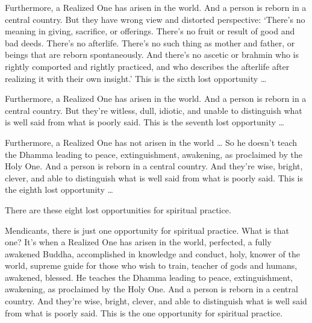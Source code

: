 \documentclass[12pt,openany]{book}%
\begin{document}
Furthermore, a Realized One has arisen in the world. And a person is reborn in a central country. But they have wrong view and distorted perspective: ‘There’s no meaning in giving, sacrifice, or offerings. There’s no fruit or result of good and bad deeds. There’s no afterlife. There’s no such thing as mother and father, or beings that are reborn spontaneously. And there’s no ascetic or brahmin who is rightly comported and rightly practiced, and who describes the afterlife after realizing it with their own insight.’ This is the sixth lost opportunity … 

Furthermore, a Realized One has arisen in the world. And a person is reborn in a central country. But they’re witless, dull, idiotic, and unable to distinguish what is well said from what is poorly said. This is the seventh lost opportunity … 

Furthermore, a Realized One has not arisen in the world … So he doesn’t teach the Dhamma leading to peace, extinguishment, awakening, as proclaimed by the Holy One. And a person is reborn in a central country. And they’re wise, bright, clever, and able to distinguish what is well said from what is poorly said. This is the eighth lost opportunity … 

There are these eight lost opportunities for spiritual practice. 

Mendicants, there is just one opportunity for spiritual practice. What is that one? It’s when a Realized One has arisen in the world, perfected, a fully awakened Buddha, accomplished in knowledge and conduct, holy, knower of the world, supreme guide for those who wish to train, teacher of gods and humans, awakened, blessed. He teaches the Dhamma leading to peace, extinguishment, awakening, as proclaimed by the Holy One. And a person is reborn in a central country. And they’re wise, bright, clever, and able to distinguish what is well said from what is poorly said. This is the one opportunity for spiritual practice. 
\end{document}
